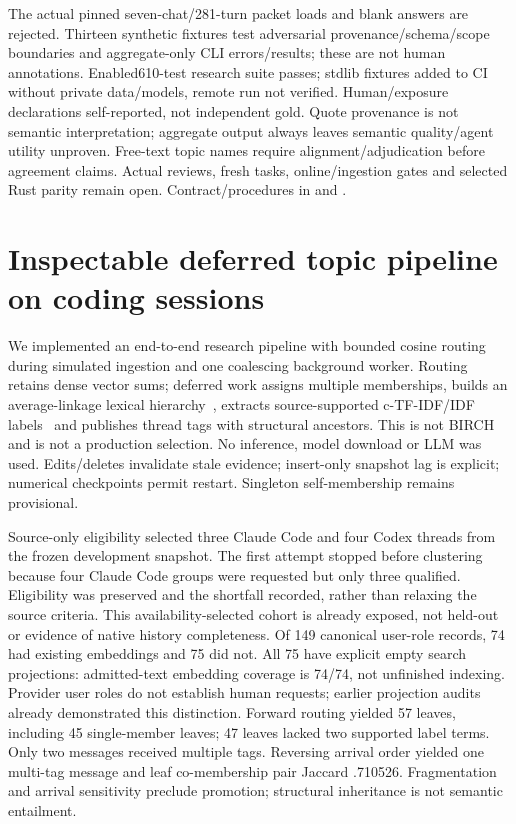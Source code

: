 \documentclass[11pt]{article}
\begin{document}
The actual pinned seven-chat/281-turn packet loads and blank answers are rejected.
Thirteen synthetic fixtures test adversarial provenance/schema/scope boundaries
and aggregate-only CLI errors/results; these are not human annotations.
Enabled610-test research suite passes; stdlib fixtures added to CI without private
data/models, remote run not verified. Human/exposure declarations self-reported,
not independent gold. Quote provenance is not semantic interpretation; aggregate
output always leaves semantic quality/agent utility unproven. Free-text topic
names require alignment/adjudication before agreement claims. Actual reviews,
fresh tasks, online/ingestion gates and selected Rust parity remain open.
Contract/procedures in  and
.

\section{Inspectable deferred topic pipeline on coding sessions}
We implemented an end-to-end research pipeline with bounded cosine routing
during simulated ingestion and one coalescing background worker. Routing
retains dense vector sums; deferred work assigns multiple memberships, builds
an average-linkage lexical hierarchy~\cite{averagelinkage}, extracts
source-supported c-TF-IDF/IDF labels~\cite{bertopic} and publishes thread tags
with structural ancestors. This is not BIRCH and is not a production selection.
No inference, model download or LLM was used. Edits/deletes invalidate stale
evidence; insert-only snapshot lag is explicit; numerical checkpoints permit
restart. Singleton self-membership remains provisional.

Source-only eligibility selected three Claude Code and four Codex threads
from the frozen development snapshot. The first attempt stopped before
clustering because four Claude Code groups were requested but only three
qualified. Eligibility was preserved and the shortfall recorded, rather than
relaxing the source criteria. This availability-selected cohort is already
exposed, not held-out or evidence of native history completeness.
Of 149 canonical user-role records, 74 had existing embeddings and 75 did not.
All 75 have explicit empty search projections: admitted-text embedding coverage
is 74/74, not unfinished indexing. Provider user roles do not establish human
requests; earlier projection audits already demonstrated this distinction.
Forward routing
yielded 57 leaves, including 45 single-member leaves; 47 leaves lacked two
supported label terms. Only two messages received multiple tags. Reversing
arrival order yielded one multi-tag message and leaf co-membership pair
Jaccard .710526. Fragmentation and arrival sensitivity preclude promotion;
structural inheritance is not semantic entailment.
\end{document}
